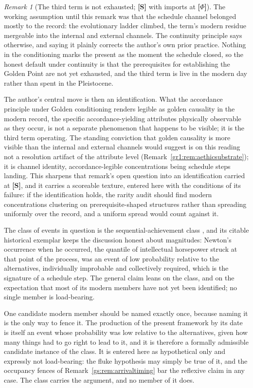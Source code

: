 \documentclass[11pt]{article}
\numberwithin{equation}{section}
\theoremstyle{plain}
\theoremstyle{definition}
\theoremstyle{remark}
\newtheorem{remark}[theorem]{Remark}
\begin{document}
\begin{remark}[The third term is not exhausted; \textbf{[S]} with imports at \textbf{[$\Phi$]}]
\label{sch:rem:notexhausted}
The working assumption until this remark was that the schedule
channel belonged mostly to the record: the evolutionary ladder
climbed, the term's modern residue mergeable into the internal and
external channels. The continuity principle says otherwise, and
saying it plainly corrects the author's own prior practice. Nothing
in the conditioning marks the present as the moment the schedule
closed, so the honest default under continuity is that the
prerequisites for establishing the Golden Point are not yet
exhausted, and the third term is live in the modern day rather than
spent in the Pleistocene.

The author's central move is then an identification. What the
accordance principle under Golden conditioning renders legible as
golden causality in the modern record, the specific
accordance-yielding attributes physically observable as they occur,
is not a separate phenomenon that happens to be visible; it is the
third term operating. The standing conviction that golden causality
is more visible than the internal and external channels would
suggest is on this reading not a resolution artifact of the
attribute level (Remark~\ref{gr1:rem:aethicsubstrate}); it is
channel identity, accordance-legible concentrations being schedule
steps landing. This sharpens that remark's open question into an
identification carried at \textbf{[S]}, and it carries a scoreable
texture, entered here with the conditions of its failure: if the
identification holds, the rarity audit should find modern
concentrations clustering on prerequisite-shaped structures rather
than spreading uniformly over the record, and a uniform spread would
count against it.

The class of events in question is the sequential-achievement class
\cite{Ben25Seq}, and its citable historical exemplar keeps the
discussion honest about magnitudes: Newton's occurrence when he
occurred, the quantile of intellectual horsepower struck at that
point of the process, was an event of low probability relative to
the alternatives, individually improbable and collectively required,
which is the signature of a schedule step. The general claim leans
on the class, and on the expectation that most of its modern members
have not yet been identified; no single member is load-bearing.

One candidate modern member should be named exactly once, because
naming it is the only way to fence it. The production of the present
framework by its date is itself an event whose probability was low
relative to the alternatives, given how many things had to go right
to lead to it, and it is therefore a formally admissible candidate
instance of the class. It is entered here as hypothetical only and
expressly not load-bearing: the fluke hypothesis may simply be true
of it, and the occupancy fences of
Remark~\ref{gs:rem:arrivaltiming} bar the reflexive claim in any
case. The class carries the argument, and no member of it does.


\end{remark}
\end{document}
